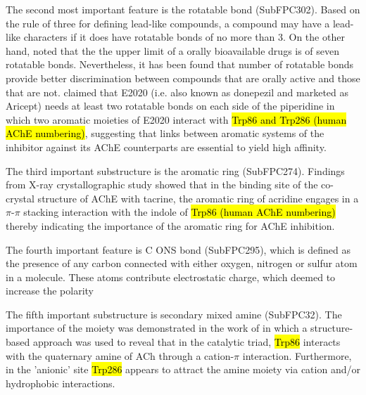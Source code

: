 \documentclass[fleqn,10pt]{wlpeerj}
\begin{document}
The second most important feature is the rotatable bond (SubFPC302). Based on the rule of three for defining lead-like compounds, a compound may have a lead-like characters if it does have rotatable bonds of no more than 3. On the other hand, \cite{veber2002molecular} noted that the the upper limit of a orally bioavailable drugs is of seven rotatable bonds. Nevertheless, it has been found that number of rotatable bonds provide better discrimination between compounds that are orally active and those that are not. \cite{kryger1999structure} claimed that E2020 (i.e. also known as donepezil and marketed as Aricept) needs at least two rotatable bonds on each side of the piperidine in which two aromatic moieties of E2020 interact with \hl{Trp86 and Trp286 (human AChE numbering)}, suggesting that links between aromatic systems of the inhibitor against its AChE counterparts are essential to yield high affinity. 

The third important substructure is the aromatic ring (SubFPC274). Findings from X-ray crystallographic study showed that in the binding site of the co-crystal structure of AChE with tacrine, the aromatic ring of acridine engages in a $\pi$-$\pi$ stacking interaction with the indole of \hl{Trp86 (human AChE numbering)} thereby indicating the importance of the aromatic ring for AChE inhibition. \cite{chen2012discovery}

The fourth important feature is C ONS bond (SubFPC295), which is defined as the presence of any carbon connected with either oxygen, nitrogen or sulfur atom in a molecule. These atoms contribute electrostatic charge, which deemed to increase the polarity 


The fifth important substructure is secondary mixed amine (SubFPC32). The importance of the moiety was demonstrated in the work of \cite{bembenek2008lead} in which a structure-based approach was used to reveal that in the catalytic triad, \hl{Trp86} interacts with the quaternary amine of ACh through a cation-$\pi$ interaction. Furthermore, in the 'anionic' site \hl{Trp286} appears to attract the amine moiety via cation and/or hydrophobic interactions. 
\end{document}
